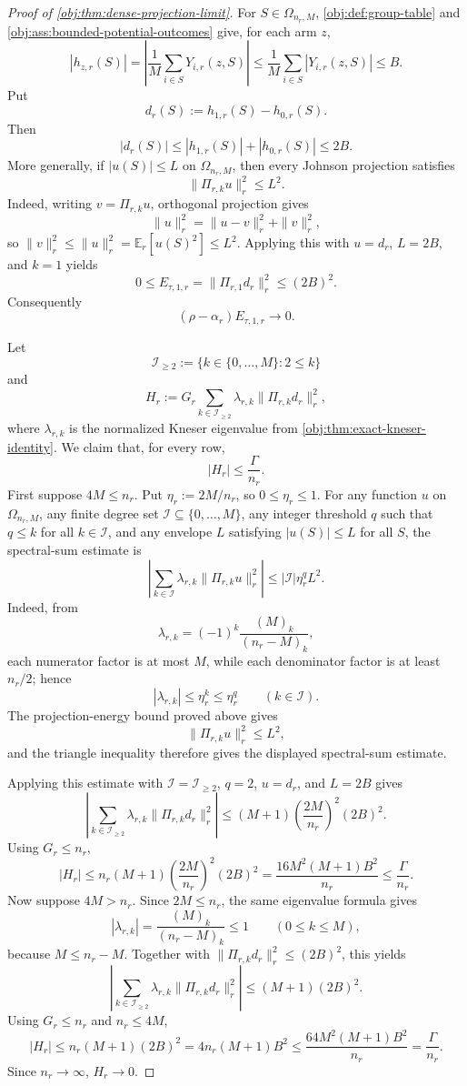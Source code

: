 \begin{proof}[Proof of \cref{obj:thm:dense-projection-limit}]
For \(S\in\Omega_{n_r,M}\), \cref{obj:def:group-table} and \cref{obj:ass:bounded-potential-outcomes} give, for each arm \(z\),
\[
|h_{z,r}(S)|
=
\left|
\frac1M\sum_{i\in S}Y_{i,r}(z,S)
\right|
\le
\frac1M\sum_{i\in S}|Y_{i,r}(z,S)|
\le B .
\]
Put
\[
d_r(S):=h_{1,r}(S)-h_{0,r}(S).
\]
Then
\[
|d_r(S)|\le |h_{1,r}(S)|+|h_{0,r}(S)|\le 2B .
\]
More generally, if \(|u(S)|\le L\) on \(\Omega_{n_r,M}\), then every Johnson projection satisfies
\[
\|\Pi_{r,k}u\|_r^2\le L^2 .
\]
Indeed, writing \(v=\Pi_{r,k}u\), orthogonal projection gives
\[
\|u\|_r^2=\|u-v\|_r^2+\|v\|_r^2,
\]
so \(\|v\|_r^2\le \|u\|_r^2=\mathbb E_r[u(S)^2]\le L^2\).  Applying this with \(u=d_r\), \(L=2B\), and \(k=1\) yields
\[
0\le E_{\tau,1,r}
=
\|\Pi_{r,1}d_r\|_r^2
\le (2B)^2 .
\]
Consequently
\[
(\rho-\alpha_r)E_{\tau,1,r}\to0 .
\]

Let
\[
\mathcal I_{\ge2}:=\{k\in\{0,\ldots,M\}:2\le k\}
\]
and
\[
H_r:=
G_r\sum_{k\in\mathcal I_{\ge2}}\lambda_{r,k}\|\Pi_{r,k}d_r\|_r^2 ,
\]
where \(\lambda_{r,k}\) is the normalized Kneser eigenvalue from \cref{obj:thm:exact-kneser-identity}.  We claim that, for every row,
\[
|H_r|\le \frac{\Gamma}{n_r}.
\]
First suppose \(4M\le n_r\).  Put \(\eta_r:=2M/n_r\), so \(0\le\eta_r\le1\).  For any function \(u\) on \(\Omega_{n_r,M}\), any finite degree set \(\mathcal I\subseteq\{0,\ldots,M\}\), any integer threshold \(q\) such that \(q\le k\) for all \(k\in\mathcal I\), and any envelope \(L\) satisfying \(|u(S)|\le L\) for all \(S\), the spectral-sum estimate is
\[
\left|
\sum_{k\in\mathcal I}\lambda_{r,k}\|\Pi_{r,k}u\|_r^2
\right|
\le
|\mathcal I|\eta_r^qL^2 .
\]
Indeed, from
\[
\lambda_{r,k}=(-1)^k\frac{(M)_k}{(n_r-M)_k},
\]
each numerator factor is at most \(M\), while each denominator factor is at least \(n_r/2\); hence
\[
|\lambda_{r,k}|\le\eta_r^k\le\eta_r^q
\qquad (k\in\mathcal I).
\]
The projection-energy bound proved above gives
\[
\|\Pi_{r,k}u\|_r^2\le L^2,
\]
and the triangle inequality therefore gives the displayed spectral-sum estimate.

Applying this estimate with \(\mathcal I=\mathcal I_{\ge2}\), \(q=2\), \(u=d_r\), and \(L=2B\) gives
\[
\left|
\sum_{k\in\mathcal I_{\ge2}}\lambda_{r,k}\|\Pi_{r,k}d_r\|_r^2
\right|
\le
(M+1)\left(\frac{2M}{n_r}\right)^2(2B)^2 .
\]
Using \(G_r\le n_r\),
\[
|H_r|
\le
n_r(M+1)\left(\frac{2M}{n_r}\right)^2(2B)^2
=
\frac{16M^2(M+1)B^2}{n_r}
\le
\frac{\Gamma}{n_r}.
\]
Now suppose \(4M>n_r\).  Since \(2M\le n_r\), the same eigenvalue formula gives
\[
|\lambda_{r,k}|=\frac{(M)_k}{(n_r-M)_k}\le1
\qquad (0\le k\le M),
\]
because \(M\le n_r-M\).  Together with \(\|\Pi_{r,k}d_r\|_r^2\le(2B)^2\), this yields
\[
\left|
\sum_{k\in\mathcal I_{\ge2}}\lambda_{r,k}\|\Pi_{r,k}d_r\|_r^2
\right|
\le
(M+1)(2B)^2 .
\]
Using \(G_r\le n_r\) and \(n_r\le4M\),
\[
|H_r|
\le
n_r(M+1)(2B)^2
=4n_r(M+1)B^2
\le
\frac{64M^2(M+1)B^2}{n_r}
=
\frac{\Gamma}{n_r}.
\]
Since \(n_r\to\infty\), \(H_r\to0\).


\end{proof}
